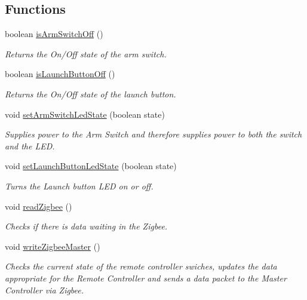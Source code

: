 \subsection*{\-Functions}
\begin{DoxyCompactItemize}
\item 
boolean \hyperlink{remotePanel_8ino_a7c723c2671b19e432fe7591335b10841}{is\-Arm\-Switch\-Off} ()
\begin{DoxyCompactList}\small\item\em \-Returns the \-On/\-Off state of the arm switch. \end{DoxyCompactList}\item 
boolean \hyperlink{remotePanel_8ino_afb88fc2a270307376ca0ed8fba1ac7fa}{is\-Launch\-Button\-Off} ()
\begin{DoxyCompactList}\small\item\em \-Returns the \-On/\-Off state of the launch button. \end{DoxyCompactList}\item 
void \hyperlink{remotePanel_8ino_ae471e487c9a5e4c5fa1ce5533d49a25a}{set\-Arm\-Switch\-Led\-State} (boolean state)
\begin{DoxyCompactList}\small\item\em \-Supplies power to the \-Arm \-Switch and therefore supplies power to both the switch and the \-L\-E\-D. \end{DoxyCompactList}\item 
void \hyperlink{remotePanel_8ino_a0d3d1c5ed13354526829e2f48e95ec10}{set\-Launch\-Button\-Led\-State} (boolean state)
\begin{DoxyCompactList}\small\item\em \-Turns the \-Launch button \-L\-E\-D on or off. \end{DoxyCompactList}\item 
void \hyperlink{remotePanel_8ino_aa52415de65bdd171ce3eefcf2439d5bb}{read\-Zigbee} ()
\begin{DoxyCompactList}\small\item\em \-Checks if there is data waiting in the \-Zigbee. \end{DoxyCompactList}\item 
void \hyperlink{remotePanel_8ino_a9ad71d5a59d49ba8ccdb3d533e9324d1}{write\-Zigbee\-Master} ()
\begin{DoxyCompactList}\small\item\em \-Checks the current state of the remote controller swiches, updates the data appropriate for the \-Remote \-Controller and sends a data packet to the \-Master \-Controller via \-Zigbee. \end{DoxyCompactList}\item 

\end{DoxyCompactItemize}
